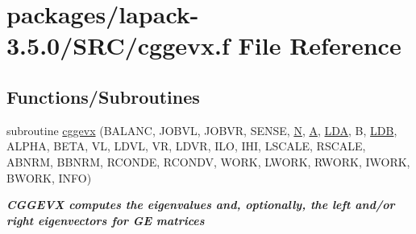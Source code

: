\hypertarget{cggevx_8f}{}\section{packages/lapack-\/3.5.0/\+S\+R\+C/cggevx.f File Reference}
\label{cggevx_8f}
\subsection*{Functions/\+Subroutines}
\begin{DoxyCompactItemize}
\item 
subroutine \hyperlink{group__complexGEeigen_gad681a6edd407ef1e9ac9b6ee92ddbee3}{cggevx} (B\+A\+L\+A\+N\+C, J\+O\+B\+V\+L, J\+O\+B\+V\+R, S\+E\+N\+S\+E, \hyperlink{polmisc_8c_a0240ac851181b84ac374872dc5434ee4}{N}, \hyperlink{classA}{A}, \hyperlink{example__user_8c_ae946da542ce0db94dced19b2ecefd1aa}{L\+D\+A}, B, \hyperlink{example__user_8c_a50e90a7104df172b5a89a06c47fcca04}{L\+D\+B}, A\+L\+P\+H\+A, B\+E\+T\+A, V\+L, L\+D\+V\+L, V\+R, L\+D\+V\+R, I\+L\+O, I\+H\+I, L\+S\+C\+A\+L\+E, R\+S\+C\+A\+L\+E, A\+B\+N\+R\+M, B\+B\+N\+R\+M, R\+C\+O\+N\+D\+E, R\+C\+O\+N\+D\+V, W\+O\+R\+K, L\+W\+O\+R\+K, R\+W\+O\+R\+K, I\+W\+O\+R\+K, B\+W\+O\+R\+K, I\+N\+F\+O)
\begin{DoxyCompactList}\small\item\em {\bfseries  C\+G\+G\+E\+V\+X computes the eigenvalues and, optionally, the left and/or right eigenvectors for G\+E matrices} \end{DoxyCompactList}\end{DoxyCompactItemize}
